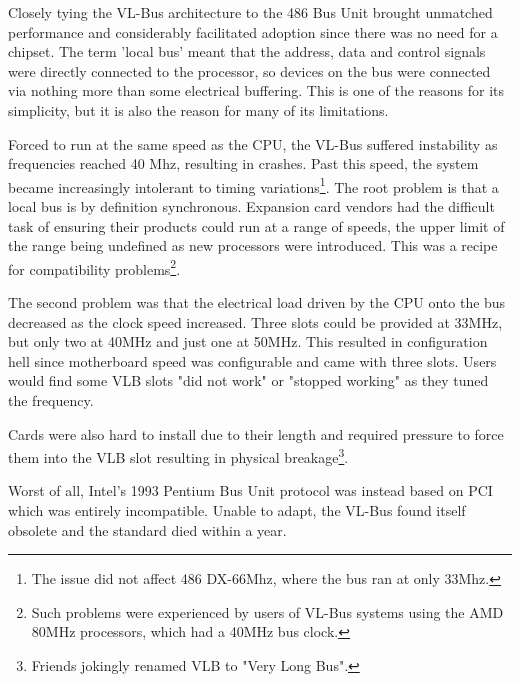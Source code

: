 \par
Closely tying the VL-Bus architecture to the 486 Bus Unit brought unmatched performance and considerably facilitated adoption since there was no need for a chipset. The term 'local bus' meant that the address, data and control signals were directly connected to the processor, so devices on the bus were connected via nothing more than some electrical buffering. This is one of the reasons for its simplicity, but it is also the reason for many of its limitations.\\
\par
Forced to run at the same speed as the CPU, the VL-Bus suffered instability as frequencies reached 40 Mhz, resulting in crashes. Past this speed, the system became increasingly intolerant to timing variations\footnote{The issue did not affect 486 DX-66Mhz, where the bus ran at only 33Mhz.}. The root problem is that a local bus is by definition synchronous. Expansion card vendors had the difficult task of ensuring their products could run at a range of speeds, the upper limit of the range being undefined as new processors were introduced. This was a recipe for compatibility problems\footnote{Such problems were experienced by users of VL-Bus systems using the AMD 80MHz processors, which had a 40MHz bus clock.}.\\
\par
The second problem was that the electrical load driven by the CPU onto the bus decreased as the clock speed increased. Three slots could be provided at 33MHz, but only two at 40MHz and just one at 50MHz. This resulted in configuration hell since motherboard speed was configurable and came with three slots. Users would find some VLB slots "did not work" or "stopped working" as they tuned the frequency.\\
\par
Cards were also hard to install due to their length and required pressure to force them into the VLB slot resulting in physical breakage\footnote{Friends jokingly renamed VLB to "Very Long Bus".}.\\
\par
  Worst of all, Intel's 1993 Pentium Bus Unit protocol was instead based on PCI which was entirely incompatible. Unable to adapt, the VL-Bus found itself obsolete and the standard died within a year.\\
\par

